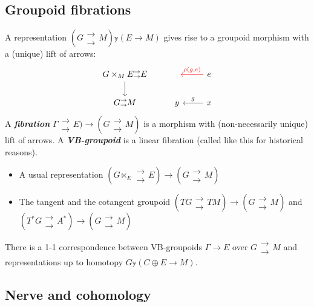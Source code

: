 \subsection{Groupoid fibrations}
A representation \((G\substack{\to\\\to}M)\mathbb{y}(E \to M)\) gives rise to a groupoid morphism with a (unique) lift of arrows:
\[\begin{tikzcd}
	G \times_M E \substack{\to\\\to}E\arrow[d]&\leavevmode& e\arrow[l,"\rho(g\text{,} e)",red,swap]\\
	G\substack{\to\\\to}M& y& x\arrow[l,"g",swap]
\end{tikzcd}\]
A \textit{\textbf{fibration}} \(\Gamma \substack{\to\\\to}E) \to (G \substack{\to\\\to}M)\) is a morphism with (non-necessarily unique) lift of arrows. A \textit{\textbf{VB-groupoid}} is a linear fibration (called like this for historical reasons).

\begin{example}\leavevmode
\begin{itemize}
\item A usual representation \((G \ltimes_E \substack{\to\\\to}E) \to (G \substack{\to\\\to} M)\)
\item The tangent and the cotangent groupoid \((TG \substack{\to\\\to} TM) \to (G \substack{\to\\\to}M)\) and \((T^*G \substack{\to\\\to}A^*) \to (G\substack{\to\\\to}M)\)
\end{itemize}
\end{example}
\begin{thm}\leavevmode
There is a 1-1 correspondence between VB-groupoids \(\Gamma\to E\) over \(G \substack{\to\\\to}M\) and {\color{2}representations up to homotopy} \(G\mathbb{y}(C \oplus  E \to M)\).
\end{thm}

\subsection{Nerve and cohomology}

